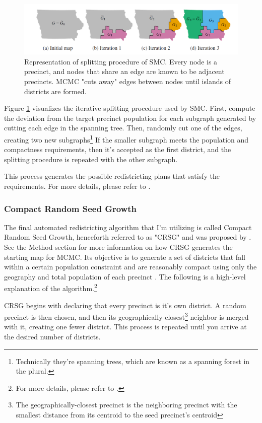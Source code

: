 \begin{figure}
    \includegraphics[width=\linewidth]{img/smc.PNG}
    \caption{Representation of splitting procedure of SMC. Every node is a precinct, and nodes that share an edge are known to be adjacent precincts. MCMC "cuts away" edges between nodes until islands of districts are formed. \parencite[14]{mccartan2020}}
    \label{fig:smc}
\end{figure}

Figure \ref{fig:smc} visualizes the iterative splitting procedure used by SMC. First, compute the deviation from the target precinct population for each subgraph generated by cutting each edge in the spanning tree. Then, randomly cut one of the edges, creating two new subgraphs\footnote{Technically they're spanning trees, which are known as a spanning forest in the plural.} If the smaller subgraph meets the population and compactness requirements, then it's accepted as the first district, and the splitting procedure is repeated with the other subgraph. 

This process generates the possible redistricting plans that satisfy the requirements. For more details, please refer to \textcite{mccartan2020}.

\subsubsection{Compact Random Seed Growth}

The final automated redistricting algorithm that I'm utilizing is called Compact Random Seed Growth, henceforth referred to as "CRSG" and was proposed by \textcite{chen2013}. See the Method section for more information on how CRSG generates the starting map for MCMC. Its objective is to generate a set of districts that fall within a certain population constraint and are reasonably compact using only the geography and total population of each precinct \parencite{chen2013}. The following is a high-level explanation of the algorithm.\footnote{For more details, please refer to \textcite[249-50]{chen2013}.} 

CRSG begins with declaring that every precinct is it's own district. A random precinct is then chosen, and then its geographically-closest\footnote{The geographically-closest precinct is the neighboring precinct with the smallest distance from its centroid to the seed precinct's centroid} neighbor is merged with it, creating one fewer district. This process is repeated until you arrive at the desired number of districts. \parencite[249-50]{chen2013}

